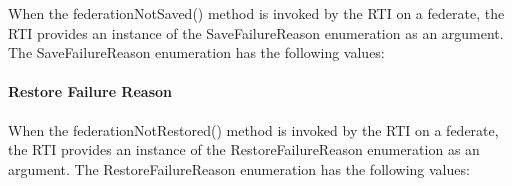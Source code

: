 \begin{compactstdpage}
    When the federationNotSaved() method is invoked by the RTI on a federate, the RTI provides an instance of the SaveFailureReason enumeration as an argument. The SaveFailureReason enumeration has the following values:


    \paragraph{Restore Failure Reason}

    When the federationNotRestored() method is invoked by the RTI on a federate, the RTI provides an instance of the RestoreFailureReason enumeration as an argument. The RestoreFailureReason enumeration has the following values:

\end{compactstdpage}

\clearpage

